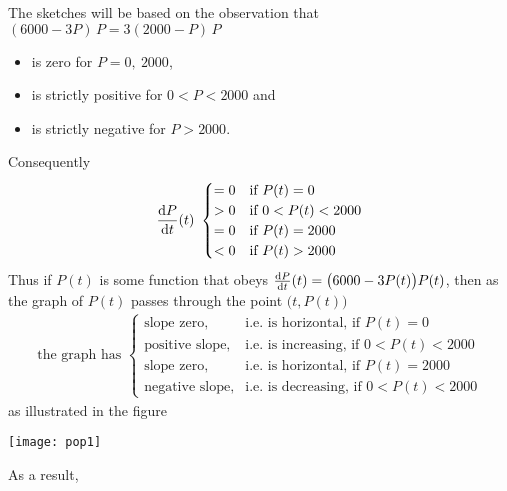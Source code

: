 \noindent The sketches will be based on the observation that
$(6000-3P)\,P=3(2000-P)\,P$
\begin{itemize} \itemsep1pt \parskip0pt
  \item is zero for $P=0,\ 2000$,
  \item is strictly positive for $0<P<2000$ and
  \item is strictly negative for $P>2000$.
\end{itemize}
Consequently
\begin{align*}
  \diff{P}{t}(t)\ \begin{cases}
                       =0  & \text{if }P(t)=0 \\
                        >0 & \text{if }0<P(t)<2000 \\
                        =0 & \text{if }P(t)=2000 \\
                        <0 & \text{if }P(t)>2000
                  \end{cases}
\end{align*}
Thus if $P(t)$ is some function that obeys
$\diff{P}{t}(t)=\big(6000-3P(t)\big)P(t)$, then as the graph of $P(t)$
passes through the point $\big(t,P(t)\big)$
\begin{align*}
\text{the graph has }
  \begin{cases}
      \text{slope zero,}& \text{i.e. is horizontal, \ \ if }P(t)=0  \\
      \text{positive slope,}& \text{i.e. is increasing, \ \ if }
                                                       0<P(t)<2000  \\
     \text{slope zero,}& \text{i.e. is horizontal, \ \ if }P(t)=2000  \\
          \text{negative slope,}& \text{i.e. is decreasing, \ \ if }0<P(t)<2000
  \end{cases}
\end{align*}
as illustrated in the figure
\begin{efig}
\begin{center}
  \texttt{[image: pop1]}
\end{center}
\end{efig}
As a result,
